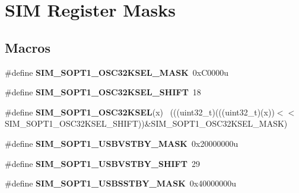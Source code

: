\hypertarget{group___s_i_m___register___masks}{}\section{S\+I\+M Register Masks}
\label{group___s_i_m___register___masks}
\subsection*{Macros}
\begin{DoxyCompactItemize}
\item 
\hypertarget{group___s_i_m___register___masks_ga5c660cd4a6d8062e6ef4afbc17c27fa4}{}\#define {\bfseries S\+I\+M\+\_\+\+S\+O\+P\+T1\+\_\+\+O\+S\+C32\+K\+S\+E\+L\+\_\+\+M\+A\+S\+K}~0x\+C0000u\label{group___s_i_m___register___masks_ga5c660cd4a6d8062e6ef4afbc17c27fa4}

\item 
\hypertarget{group___s_i_m___register___masks_gac9e930c4ee375a2aee6fa6c97e061226}{}\#define {\bfseries S\+I\+M\+\_\+\+S\+O\+P\+T1\+\_\+\+O\+S\+C32\+K\+S\+E\+L\+\_\+\+S\+H\+I\+F\+T}~18\label{group___s_i_m___register___masks_gac9e930c4ee375a2aee6fa6c97e061226}

\item 
\hypertarget{group___s_i_m___register___masks_ga7bede429b5cc2fda927f328ecd9ebd72}{}\#define {\bfseries S\+I\+M\+\_\+\+S\+O\+P\+T1\+\_\+\+O\+S\+C32\+K\+S\+E\+L}(x)                                  ~(((uint32\+\_\+t)(((uint32\+\_\+t)(x))$<$$<$S\+I\+M\+\_\+\+S\+O\+P\+T1\+\_\+\+O\+S\+C32\+K\+S\+E\+L\+\_\+\+S\+H\+I\+F\+T))\&S\+I\+M\+\_\+\+S\+O\+P\+T1\+\_\+\+O\+S\+C32\+K\+S\+E\+L\+\_\+\+M\+A\+S\+K)\label{group___s_i_m___register___masks_ga7bede429b5cc2fda927f328ecd9ebd72}

\item 
\hypertarget{group___s_i_m___register___masks_gaaf0b406e4bd1800083f48727a7cde829}{}\#define {\bfseries S\+I\+M\+\_\+\+S\+O\+P\+T1\+\_\+\+U\+S\+B\+V\+S\+T\+B\+Y\+\_\+\+M\+A\+S\+K}~0x20000000u\label{group___s_i_m___register___masks_gaaf0b406e4bd1800083f48727a7cde829}

\item 
\hypertarget{group___s_i_m___register___masks_gae945165e21faf14e58288bce0918482a}{}\#define {\bfseries S\+I\+M\+\_\+\+S\+O\+P\+T1\+\_\+\+U\+S\+B\+V\+S\+T\+B\+Y\+\_\+\+S\+H\+I\+F\+T}~29\label{group___s_i_m___register___masks_gae945165e21faf14e58288bce0918482a}

\item 
\hypertarget{group___s_i_m___register___masks_ga93a808f7a1d75e26bc3ed565ab257617}{}\#define {\bfseries S\+I\+M\+\_\+\+S\+O\+P\+T1\+\_\+\+U\+S\+B\+S\+S\+T\+B\+Y\+\_\+\+M\+A\+S\+K}~0x40000000u\label{group___s_i_m___register___masks_ga93a808f7a1d75e26bc3ed565ab257617}


\end{DoxyCompactItemize}
